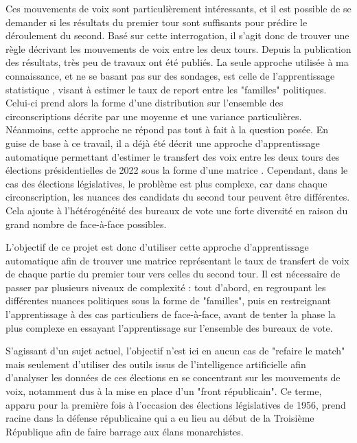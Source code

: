 \documentclass[11pt]{article}
\begin{document}
    Ces mouvements de voix sont particulièrement intéressants, et il est possible de se demander si les résultats du premier tour sont suffisants pour prédire le déroulement du second. Basé sur cette interrogation, il s'agit donc de trouver une règle décrivant les mouvements de voix entre les deux tours. Depuis la publication des résultats, très peu de travaux ont été publiés. La seule approche utilisée à ma connaissance, et ne se basant pas sur des sondages, est celle de l'apprentissage statistique \cite{Amblard_2024}, visant à estimer le taux de report entre les "familles" politiques. Celui-ci prend alors la forme d'une distribution sur l'ensemble des circonscriptions décrite par une moyenne et une variance particulières. Néanmoins, cette approche ne répond pas tout à fait à la question posée. En guise de base à ce travail, il a déjà été décrit une approche d'apprentissage automatique permettant d'estimer le transfert des voix entre les deux tours des élections présidentielles de 2022 sous la forme d'une matrice \cite{Perrinet_2022}. Cependant, dans le cas des élections législatives, le problème est plus complexe, car dans chaque circonscription, les nuances des candidats du second tour peuvent être différentes. Cela ajoute à l'hétérogénéité des bureaux de vote une forte diversité en raison du grand nombre de face-à-face possibles.

    L'objectif de ce projet est donc d'utiliser cette approche d'apprentissage automatique afin de trouver une matrice représentant le taux de transfert de voix de chaque partie du premier tour vers celles du second tour. Il est nécessaire de passer par plusieurs niveaux de complexité : tout d'abord, en regroupant les différentes nuances politiques sous la forme de "familles", puis en restreignant l'apprentissage à des cas particuliers de face-à-face, avant de tenter la phase la plus complexe en essayant l'apprentissage sur l'ensemble des bureaux de vote. 
    
    S'agissant d'un sujet actuel, l'objectif n'est ici en aucun cas de "refaire le match" mais seulement d'utiliser des outils issus de l'intelligence artificielle afin d'analyser les données de ces élections en se concentrant sur les mouvements de voix, notamment dus à la mise en place d'un "front républicain". Ce terme, apparu pour la première fois à l'occasion des élections législatives de 1956, prend racine dans la défense républicaine qui a eu lieu au début de la Troisième République afin de faire barrage aux élans monarchistes.
    
    \newpage
\end{document}
